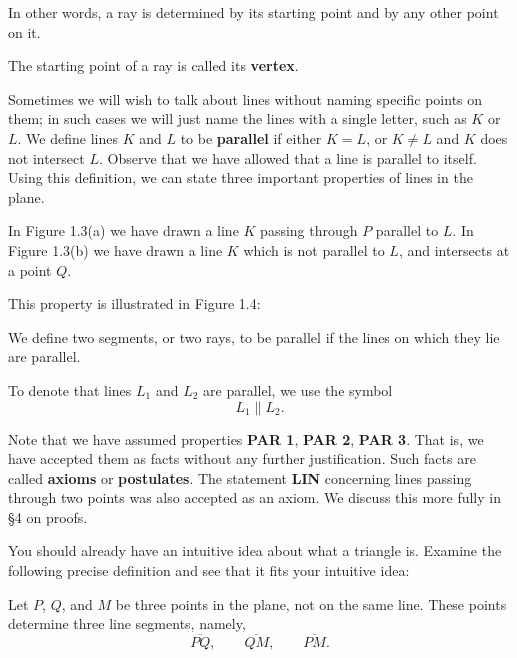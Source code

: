 \documentclass[12pt]{book} %
\begin{document}
In other words, a ray is determined by its starting point and by any other point on it.

The starting point of a ray is called its \textbf{vertex}.

Sometimes we will wish to talk about lines without naming specific points on them; in such cases we will just name the lines with a single letter, such as $K$ or $L$. We define lines $K$ and $L$ to be \textbf{parallel} if either $K=L$, or $K\neq L$ and $K$ does not intersect $L$. Observe that we have allowed that a line is parallel to itself. Using this definition, we can state three important properties of lines in the plane.



In Figure 1.3(a) we have drawn a line $K$ passing through $P$ parallel to $L$. In Figure 1.3(b) we have drawn a line $K$ which is not parallel to $L$, and intersects at a point $Q$.



This property is illustrated in Figure 1.4:


We define two segments, or two rays, to be parallel if the lines on which they lie are parallel.

To denote that lines $L_1$ and $L_2$ are parallel, we use the symbol
\[
L_1 \parallel L_2.
\]

Note that we have assumed properties \textbf{PAR 1}, \textbf{PAR 2}, \textbf{PAR 3}. That is, we have accepted them as facts without any further justification. Such facts are called \textbf{axioms} or \textbf{postulates}. The statement \textbf{LIN} concerning lines passing through two points was also accepted as an axiom. We discuss this more fully in \S4 on proofs.

You should already have an intuitive idea about what a triangle is. Examine the following precise definition and see that it fits your intuitive idea:

Let $P$, $Q$, and $M$ be three points in the plane, not on the same line. These points determine three line segments, namely,
\[
\overline{PQ},\qquad \overline{QM},\qquad \overline{PM}.
\]
\end{document}
